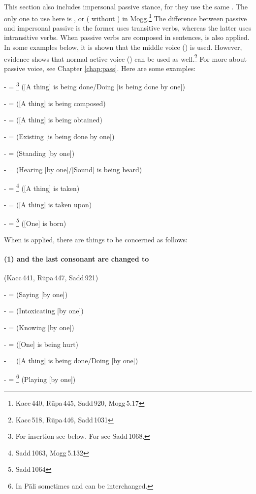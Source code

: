 This section also includes impersonal passive stance, for they use the same . The only one to use here is , or  ( without ) in Mogg.\footnote{Kacc\,440, R\=upa\,445, Sadd\,920, Mogg\,5.17} The difference between passive and impersonal passive is the former uses transitive verbs, whereas the latter uses intransitive verbs. When passive verbs are composed in sentences,  is also applied. In some examples below, it is shown that the middle voice () is used. However, evidence shows that normal active voice () can be used as well.\footnote{Kacc\,518, R\=upa\,446, Sadd\,1031} For more about passive voice, see Chapter \ref{chap:pass}. Here are some examples:\par
-  = \footnote{For  insertion see below. For  see Sadd\,1068.} ([A thing] is being done/Doing [is being done by one])\par
-  =  ([A thing] is being composed)\par
-  =  ([A thing] is being obtained)\par
-  =  (Existing [is being done by one])\par
-  =  (Standing [by one])\par
-  =  (Hearing [by one]/[Sound] is being heard)\par
-  = \footnote{Sadd\,1063, Mogg\,5.132} ([A thing] is taken)\par
-  =  ([A thing] is taken upon)\par
-  = \footnote{Sadd\,1064} ([One] is born)\par

\bigskip
When  is applied, there are things to be concerned as follows:

\paragraph*{(1)  and the last consonant are changed to } (Kacc\,441, R\=upa\,447, Sadd\,921)\par
-  =  (Saying [by one])\par
-  =  (Intoxicating [by one])\par
-  =  (Knowing [by one])\par
-  =  ([One] is being hurt)\par
-  =  ([A thing] is being done/Doing [by one])\par
-  = \footnote{In P\=ali sometimes  and  can be interchanged.} (Playing [by one])\par

